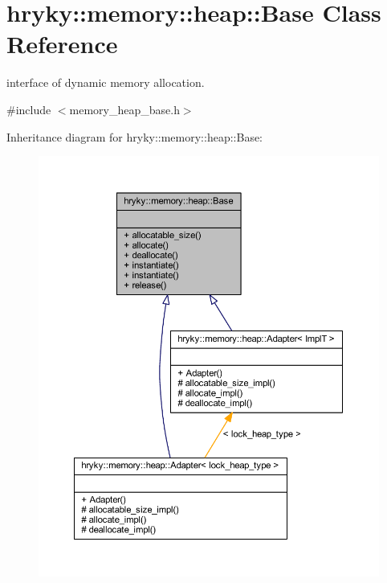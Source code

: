 \hypertarget{classhryky_1_1memory_1_1heap_1_1_base}{\section{hryky\-:\-:memory\-:\-:heap\-:\-:Base Class Reference}
\label{classhryky_1_1memory_1_1heap_1_1_base}
}


interface of dynamic memory allocation.  




{\ttfamily \#include $<$memory\-\_\-heap\-\_\-base.\-h$>$}



Inheritance diagram for hryky\-:\-:memory\-:\-:heap\-:\-:Base\-:
\nopagebreak
\begin{figure}[H]
\begin{center}
\leavevmode
\includegraphics[width=350pt]{classhryky_1_1memory_1_1heap_1_1_base__inherit__graph}
\end{center}
\end{figure}
